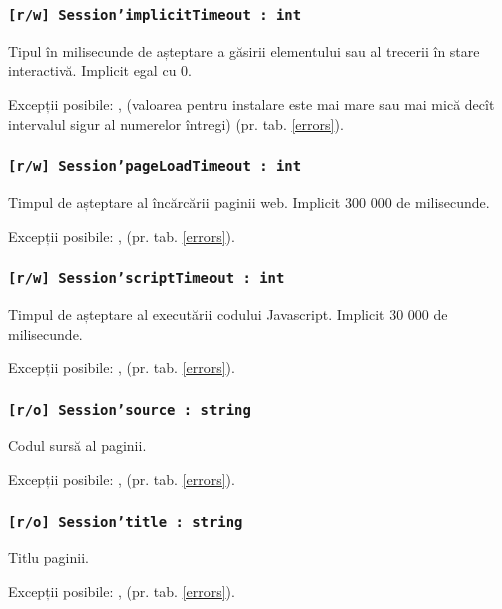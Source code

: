 \subsubsection{\texttt{[r/w] Session'implicitTimeout : int}}

Tipul în milisecunde de așteptare a găsirii elementului sau al trecerii în stare interactivă. Implicit egal cu 0.

Excepții posibile: ,  (valoarea pentru instalare este mai mare sau mai mică decît intervalul sigur al numerelor întregi) (pr. tab. \ref{errors}).

\subsubsection{\texttt{[r/w] Session'pageLoadTimeout : int}}

Timpul de așteptare al încărcării paginii web. Implicit 300 000 de milisecunde.

Excepții posibile: ,  (pr. tab. \ref{errors}).

\subsubsection{\texttt{[r/w] Session'scriptTimeout : int}}

Timpul de așteptare al executării codului Javascript. Implicit 30 000 de milisecunde.

Excepții posibile: ,  (pr. tab. \ref{errors}).

\subsubsection{\texttt{[r/o] Session'source : string}}

Codul sursă al paginii.

Excepții posibile: ,  (pr. tab. \ref{errors}).

\subsubsection{\texttt{[r/o] Session'title : string}}

Titlu paginii.

Excepții posibile: ,  (pr. tab. \ref{errors}).

